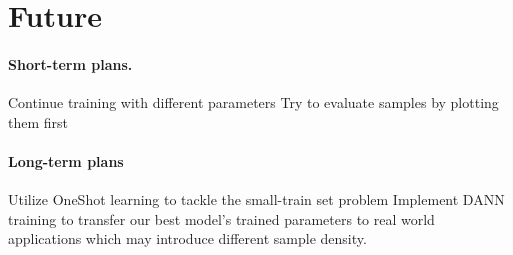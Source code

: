 \section{Future}

\paragraph{Short-term plans.}
Continue training with different parameters
Try to evaluate samples by plotting them first

\paragraph{Long-term plans}
Utilize OneShot learning to tackle the small-train set problem
Implement DANN training to transfer our best model's trained parameters to real world applications which may introduce different sample density.

